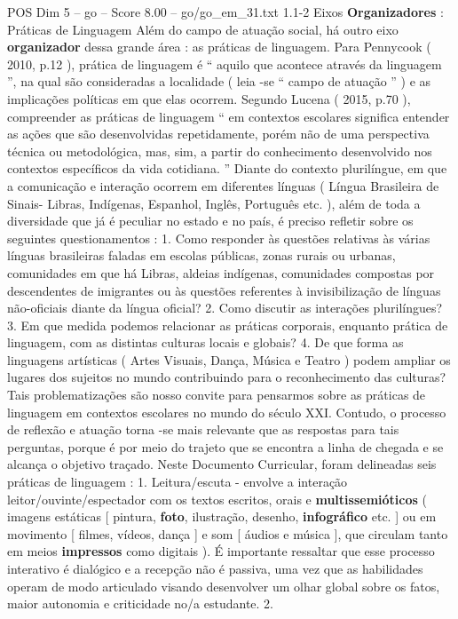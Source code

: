 \begin{textsample}{POS Dim 5 – go – Score 8.00 – go/go\_em\_31.txt}  \label{ex:f5_pos_008}
1.1-2 Eixos \textbf{Organizadores} : Práticas de Linguagem Além do campo de atuação social, há outro eixo \textbf{organizador} dessa grande área : as práticas de linguagem.
Para Pennycook ( 2010, p.12 ), prática de linguagem é “ aquilo que acontece através da linguagem ”, na qual são consideradas a localidade ( leia -se “ campo de atuação ” ) e as implicações políticas em que elas ocorrem.
Segundo Lucena ( 2015, p.70 ), compreender as práticas de linguagem “ em contextos escolares significa entender as ações que são desenvolvidas repetidamente, porém não de uma perspectiva técnica ou metodológica, mas, sim, a partir do conhecimento desenvolvido nos contextos específicos da vida cotidiana. ” Diante do contexto plurilíngue, em que a comunicação e interação ocorrem em diferentes línguas ( Língua Brasileira de Sinais- Libras, Indígenas, Espanhol, Inglês, Português etc. ), além de toda a diversidade que já é peculiar no estado e no país, é preciso refletir sobre os seguintes questionamentos : 1.
Como responder às questões relativas às várias línguas brasileiras faladas em escolas públicas, zonas rurais ou urbanas, comunidades em que há Libras, aldeias indígenas, comunidades compostas por descendentes de imigrantes ou às questões referentes à invisibilização de línguas não-oficiais diante da língua oficial? 2.
Como discutir as interações plurilíngues? 3.
Em que medida podemos relacionar as práticas corporais, enquanto prática de linguagem, com as distintas culturas locais e globais? 4.
De que forma as linguagens artísticas ( Artes Visuais, Dança, Música e Teatro ) podem ampliar os lugares dos sujeitos no mundo contribuindo para o reconhecimento das culturas?
Tais problematizações são nosso convite para pensarmos sobre as práticas de linguagem em contextos escolares no mundo do século XXI.
Contudo, o processo de reflexão e atuação torna -se mais relevante que as respostas para tais perguntas, porque é por meio do trajeto que se encontra a linha de chegada e se alcança o objetivo traçado.
Neste Documento Curricular, foram delineadas seis práticas de linguagem : 1.
Leitura/escuta - envolve a interação leitor/ouvinte/espectador com os textos escritos, orais e \textbf{multissemióticos} ( imagens estáticas [ pintura, \textbf{foto}, ilustração, desenho, \textbf{infográfico} etc. ] ou em movimento [ filmes, vídeos, dança ] e som [ áudios e música ], que circulam tanto em meios \textbf{impressos} como digitais ).
É importante ressaltar que esse processo interativo é dialógico e a recepção não é passiva, uma vez que as habilidades operam de modo articulado visando desenvolver um olhar global sobre os fatos, maior autonomia e criticidade no/a estudante. 2.

\end{textsample}
